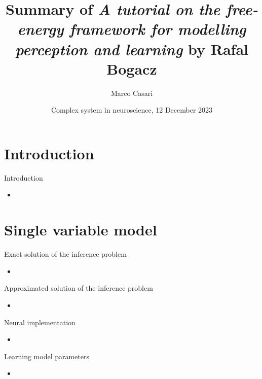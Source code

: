 \documentclass[aspectratio=43]{beamer}
\title{Summary of \emph{A tutorial on the free-energy framework for modelling perception and learning} by Rafal Bogacz}
\author{Marco Casari}
\date[12/12/2023]{Complex system in neuroscience, 12 December 2023}
\institute[UniTo]{University of Turin}
\begin{document}
\begin{frame}
  \titlepage
  \note{
    \begin{itemize}
      \item %
    \end{itemize}
  }
\end{frame}



\section{Introduction}
\begin{frame}{Introduction}
  \begin{itemize}
    \item %
  \end{itemize}
\end{frame}



\section{Single variable model}
\begin{frame}{Exact solution of the inference problem}
  \begin{itemize}
    \item %
  \end{itemize}
\end{frame}


\begin{frame}{Approximated solution of the inference problem}
  \begin{itemize}
    \item %
  \end{itemize}
\end{frame}


\begin{frame}{Neural implementation}
  \begin{itemize}
    \item %
  \end{itemize}
\end{frame}


\begin{frame}{Learning model parameters}
  \begin{itemize}
    \item %
  \end{itemize}
\end{frame}
\end{document}
